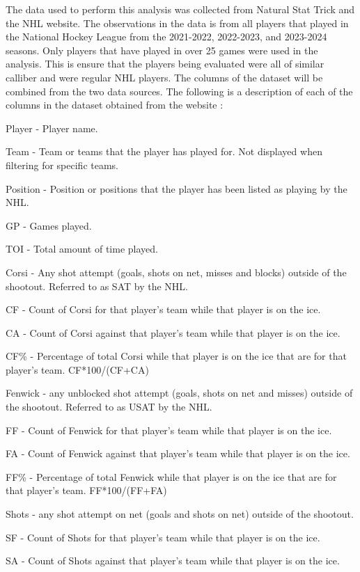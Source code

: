 \documentclass[12pt]{article}
\begin{document}
The data used to perform this analysis was collected from Natural Stat Trick and the NHL website. The observations in the data
is from all players that played in the National Hockey League from the 2021-2022, 2022-2023, and 2023-2024 seasons. Only players
that have played in over 25 games were used in the analysis. This is ensure that the players being evaluated were all of similar 
calliber and were regular NHL players. The columns of the dataset will be combined from the two data sources. The following is a 
description of each of the columns in the dataset obtained from the website \cite{natural_stat_trick}:

Player - Player name.

Team - Team or teams that the player has played for. Not displayed when filtering for specific teams.

Position - Position or positions that the player has been listed as playing by the NHL.

GP - Games played.

TOI - Total amount of time played.

Corsi - Any shot attempt (goals, shots on net, misses and blocks) outside of the shootout. Referred to as SAT by the NHL.

CF - Count of Corsi for that player's team while that player is on the ice.

CA - Count of Corsi against that player's team while that player is on the ice.

CF\% - Percentage of total Corsi while that player is on the ice that are for that player's team. CF*100/(CF+CA)

Fenwick - any unblocked shot attempt (goals, shots on net and misses) outside of the shootout. Referred to as USAT by the NHL.

FF - Count of Fenwick for that player's team while that player is on the ice.

FA - Count of Fenwick against that player's team while that player is on the ice.

FF\% - Percentage of total Fenwick while that player is on the ice that are for that player's team. FF*100/(FF+FA)

Shots - any shot attempt on net (goals and shots on net) outside of the shootout.

SF - Count of Shots for that player's team while that player is on the ice.

SA - Count of Shots against that player's team while that player is on the ice.
\end{document}

